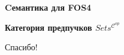 \documentclass{beamer}
\begin{document}
\begin{frame}{}
\begin{center}
	\textbf{Cемантика для FOS4}
\end{center}
\end{frame}




\begin{frame}{}
\begin{center}
	\textbf{Категория предпучков $Sets^{\mathcal{C}^{op}}$}
\end{center}
\end{frame}



\begin{frame}{}
    \thispagestyle{empty}
    \begin{center}
        {\large Спасибо!}
    \end{center}
\end{frame}


\end{document}

